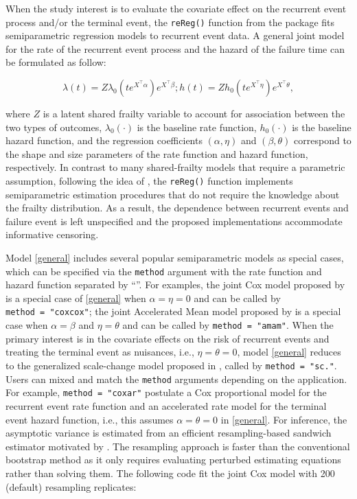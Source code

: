 When the study interest is to evaluate the covariate effect on the
recurrent event process and/or the terminal event, the \texttt{reReg()}
function from the  package fits semiparametric regression
models to recurrent event data. A general joint model for the rate of
the recurrent event process and the hazard of the failure time can be
formulated as follow:

\begin{equation}
\lambda(t) = Z \lambda_0(te^{X^\top\alpha})e^{X^\top\beta};
h(t) = Z h_0(te^{X^\top\eta})e^{X^\top\theta},
\label{general}
\end{equation}

where \(Z\) is a latent shared frailty variable to account for
association between the two types of outcomes, \(\lambda_0(\cdot)\) is
the baseline rate function, \(h_0(\cdot)\) is the baseline hazard
function, and the regression coefficients \((\alpha, \eta)\) and
\((\beta, \theta)\) correspond to the shape and size parameters of the
rate function and hazard function, respectively. In contrast to many
shared-frailty models that require a parametric assumption, following
the idea of \citet{wang2001analyzing}, the \texttt{reReg()} function
implements semiparametric estimation procedures that do not require the
knowledge about the frailty distribution. As a result, the dependence
between recurrent events and failure event is left unspecified and the
proposed implementations accommodate informative censoring.

Model \eqref{general} includes several popular semiparametric models as
special cases, which can be specified via the \texttt{method} argument
with the rate function and hazard function separated by
``\texttt{\textbar{}}''. For examples, the joint Cox model proposed by
\citet{huang2004joint} is a special case of \eqref{general} when
\(\alpha = \eta = 0\) and can be called by
\texttt{method\ =\ "cox\textbar{}cox"}; the joint Accelerated Mean model
proposed by \citet{xu2017joint} is a special case when
\(\alpha = \beta\) and \(\eta = \theta\) and can be called by
\texttt{method\ =\ "am\textbar{}am"}. When the primary interest is in
the covariate effects on the risk of recurrent events and treating the
terminal event as nuisances, i.e., \(\eta = \theta = 0\), model
\eqref{general} reduces to the generalized scale-change model proposed
in \citet{xu2019generalized}, called by
\texttt{method\ =\ "sc\textbar{}."}. Users can mixed and match the
\texttt{method} arguments depending on the application. For example,
\texttt{method\ =\ "cox\textbar{}ar"} postulate a Cox proportional model
for the recurrent event rate function and an accelerated rate model for
the terminal event hazard function, i.e., this assumes
\(\alpha = \theta = 0\) in \eqref{general}. For inference, the
asymptotic variance is estimated from an efficient resampling-based
sandwich estimator motivated by \citet{zeng2008efficient}. The
resampling approach is faster than the conventional bootstrap method as
it only requires evaluating perturbed estimating equations rather than
solving them. The following code fit the joint Cox model with 200
(default) resampling replicates:

